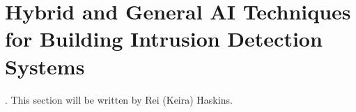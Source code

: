 \section{Hybrid and General AI Techniques for Building Intrusion Detection Systems}
. This section will be written by Rei (Keira) Haskins.
